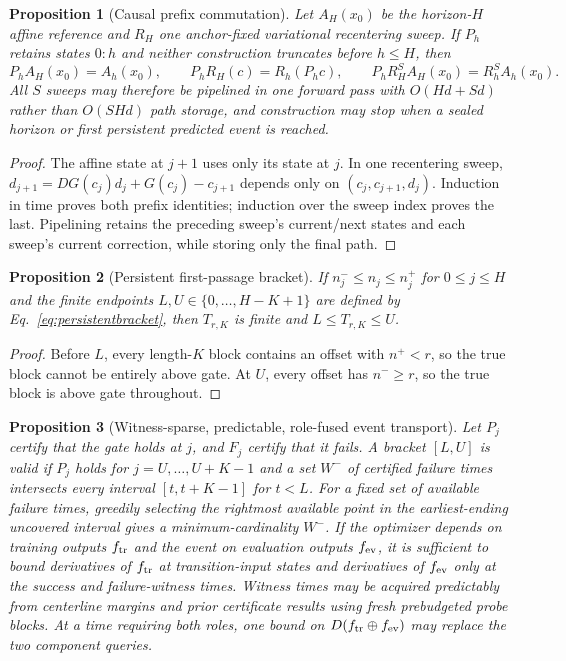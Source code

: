 \documentclass{article}
\newtheorem{proposition}{Proposition}
\begin{document}
\begin{proposition}[Causal prefix commutation]
\label{prop:causal-prefix}
Let $A_H(x_0)$ be the horizon-$H$ affine reference and $R_H$ one anchor-fixed
variational recentering sweep.  If $P_h$ retains states $0{:}h$ and neither
construction truncates before $h\le H$, then
\begin{equation}
 P_hA_H(x_0)=A_h(x_0),\qquad
 P_hR_H(c)=R_h(P_hc),\qquad
 P_hR_H^SA_H(x_0)=R_h^SA_h(x_0).
 \label{eq:prefix-commutation}
\end{equation}
All $S$ sweeps may therefore be pipelined in one forward pass with
$O(Hd+Sd)$ rather than $O(SHd)$ path storage, and construction may stop when a
sealed horizon or first persistent predicted event is reached.
\end{proposition}

\begin{proof}
The affine state at $j+1$ uses only its state at $j$.  In one recentering
sweep, $d_{j+1}=DG(c_j)d_j+G(c_j)-c_{j+1}$ depends only on
$(c_j,c_{j+1},d_j)$.  Induction in time proves both prefix identities; induction
over the sweep index proves the last.  Pipelining retains the preceding sweep's
current/next states and each sweep's current correction, while storing only the
final path.
\end{proof}

\begin{proposition}[Persistent first-passage bracket]
If $n^-_j\le n_j\le n^+_j$ for $0\le j\le H$ and the finite endpoints
$L,U\in\{0,\ldots,H-K+1\}$ are defined by
Eq.~\eqref{eq:persistentbracket}, then $T_{r,K}$ is finite and
$L\le T_{r,K}\le U$.
\end{proposition}

\begin{proof}
Before $L$, every length-$K$ block contains an offset with $n^+<r$, so the
true block cannot be entirely above gate.  At $U$, every offset has
$n^-\ge r$, so the true block is above gate throughout.
\end{proof}

\begin{proposition}[Witness-sparse, predictable, role-fused event transport]
\label{prop:witness-sparse}
Let $P_j$ certify that the gate holds at $j$, and $F_j$ certify that it fails.
A bracket $[L,U]$ is valid if $P_j$ holds for
$j=U,\ldots,U+K-1$ and a set $W^-$ of certified failure times intersects
every interval $[t,t+K-1]$ for $t<L$.  For a fixed set of available failure
times, greedily selecting the rightmost available point in the earliest-ending
uncovered interval gives a minimum-cardinality $W^-$.  If the optimizer depends
on training outputs $f_{\rm tr}$ and the event on evaluation outputs
$f_{\rm ev}$, it is sufficient to bound derivatives of $f_{\rm tr}$ at
transition-input states and derivatives of $f_{\rm ev}$ only at the success
and failure-witness times.  Witness times may be acquired predictably from
centerline margins and prior certificate results using fresh prebudgeted probe
blocks.  At a time requiring both roles, one bound on
$D(f_{\rm tr}\oplus f_{\rm ev})$ may replace the two component queries.
\end{proposition}
\end{document}
